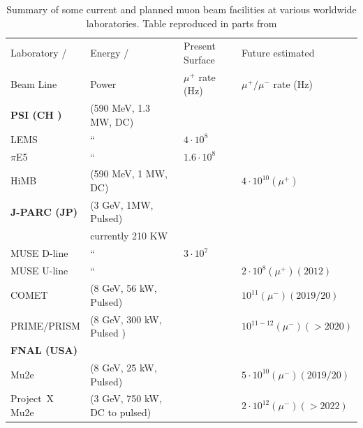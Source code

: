 \begin{table}[ht]
\begin{center}
\caption{Summary of some current and planned muon beam facilities at various worldwide laboratories. Table reproduced in parts from \cite{Blondel:2013ia} \label{table:cl:muonrates}}
{ \begin{tabular}{llll}\\
\hline
Laboratory / & Energy / & Present Surface  & Future estimated  \\
Beam Line & Power & $\mu^{+}$ rate (Hz) & $\mu^{+}/\mu^{-}$ rate (Hz) \\
\hline
\bf{PSI (CH )} & (590 MeV, 1.3 MW, DC) &  & \\
LEMS & `` & $4 \cdot 10^8$ &  \\
$\pi$E5 & `` & $1.6 \cdot 10^8$  & \\
HiMB & (590 MeV, 1 MW, DC) & & $4\cdot 10^{10} (\mu^{+})$ \\
\hline
\bf{J-PARC (JP)} & (3 GeV, 1MW, Pulsed) & & \\
 & currently 210 KW &  & \\
 MUSE D-line & `` & $3 \cdot 10^7$ & \\
 MUSE U-line & `` &  & $2\cdot 10^8 (\mu^{+})(2012)$ \\
 COMET & (8 GeV, 56 kW, Pulsed) & & $10^{11} (\mu^{-})(2019/20) $\\
 PRIME/PRISM & (8 GeV, 300 kW, Pulsed ) & & $10^{11-12}(\mu^{-}) ( > 2020)$ \\
 \hline
 \bf{FNAL (USA)} & &  & \\
 Mu2e & (8 GeV, 25 kW, Pulsed) & & $5\cdot 10^{10} (\mu^{-})(2019/20) $\\ 
 Project~X Mu2e & (3 GeV, 750 kW, DC to pulsed) & & $2\cdot 10^{12} (\mu^{-})(>2022)$ \\
\hline 
\end{tabular}}
\end{center}
\end{table}

